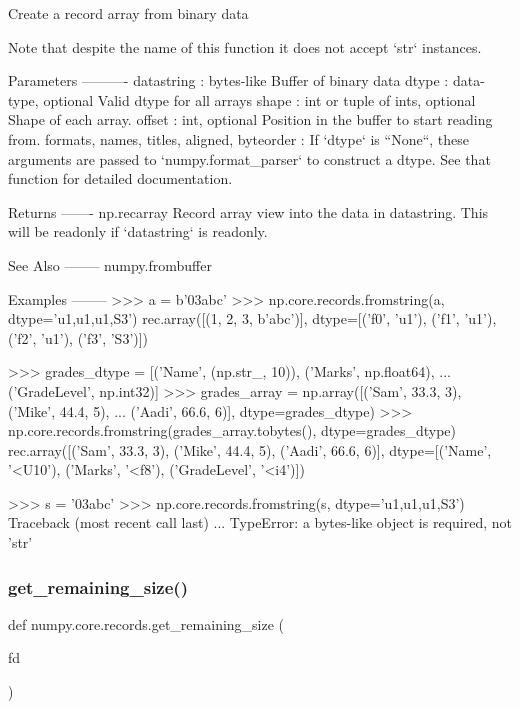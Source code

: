 \begin{DoxyVerb}Create a record array from binary data

Note that despite the name of this function it does not accept `str`
instances.

Parameters
----------
datastring : bytes-like
    Buffer of binary data
dtype : data-type, optional
    Valid dtype for all arrays
shape : int or tuple of ints, optional
    Shape of each array.
offset : int, optional
    Position in the buffer to start reading from.
formats, names, titles, aligned, byteorder :
    If `dtype` is ``None``, these arguments are passed to
    `numpy.format_parser` to construct a dtype. See that function for
    detailed documentation.


Returns
-------
np.recarray
    Record array view into the data in datastring. This will be readonly
    if `datastring` is readonly.

See Also
--------
numpy.frombuffer

Examples
--------
>>> a = b'\x03abc'
>>> np.core.records.fromstring(a, dtype='u1,u1,u1,S3')
rec.array([(1, 2, 3, b'abc')],
        dtype=[('f0', 'u1'), ('f1', 'u1'), ('f2', 'u1'), ('f3', 'S3')])

>>> grades_dtype = [('Name', (np.str_, 10)), ('Marks', np.float64),
...                 ('GradeLevel', np.int32)]
>>> grades_array = np.array([('Sam', 33.3, 3), ('Mike', 44.4, 5),
...                         ('Aadi', 66.6, 6)], dtype=grades_dtype)
>>> np.core.records.fromstring(grades_array.tobytes(), dtype=grades_dtype)
rec.array([('Sam', 33.3, 3), ('Mike', 44.4, 5), ('Aadi', 66.6, 6)],
        dtype=[('Name', '<U10'), ('Marks', '<f8'), ('GradeLevel', '<i4')])

>>> s = '\x03abc'
>>> np.core.records.fromstring(s, dtype='u1,u1,u1,S3')
Traceback (most recent call last)
   ...
TypeError: a bytes-like object is required, not 'str'
\end{DoxyVerb}
 \mbox{\label{namespacenumpy_1_1core_1_1records_a0467f6e94bff0117237f78b014391346}} 
\subsubsection{\texorpdfstring{get\+\_\+remaining\+\_\+size()}{get\_remaining\_size()}}
{\footnotesize\ttfamily def numpy.\+core.\+records.\+get\+\_\+remaining\+\_\+size (\begin{DoxyParamCaption}\item[{}]{fd }\end{DoxyParamCaption})}



